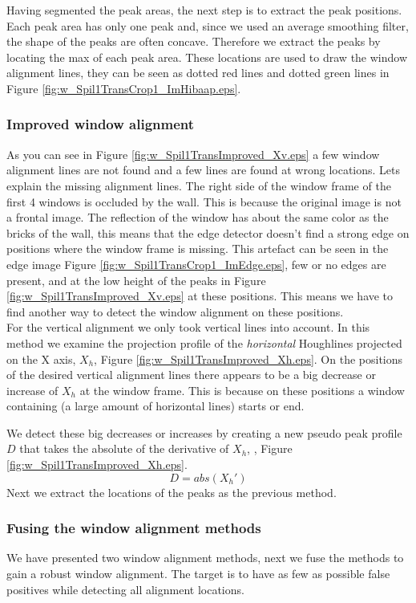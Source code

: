 Having segmented the peak areas, the next step is to extract the peak positions. 
Each peak area has only one peak and, since we used an average smoothing filter, the shape of 
the peaks are often concave. Therefore we extract the peaks by locating the max of each peak area. 
These locations are used to draw the window alignment lines, they can be seen
as dotted red lines and dotted green lines in Figure \ref{fig:w_Spil1TransCrop1_ImHibaap.eps}.


\subsubsection{Improved window alignment}
As you can see in Figure \ref{fig:w_Spil1TransImproved_Xv.eps}
a few window alignment lines are not found and a few lines are found at wrong locations.
Lets explain the missing alignment lines.
The right side of the window frame of the first 4 windows is occluded by the
wall. This is because the original image is not a frontal image.
The reflection of the window has about the same color as the bricks of
the wall, this means that the edge detector
doesn't find a strong edge on positions where the window frame is missing.
This artefact can be seen in the edge image Figure \ref{fig:w_Spil1TransCrop1_ImEdge.eps}, few or no edges are present, and
at the low height of the peaks in Figure \ref{fig:w_Spil1TransImproved_Xv.eps} at these positions.
This means we have to find another way to detect the window alignment on these positions.\\

For the vertical alignment we only took vertical lines into account.
In this method we examine the projection profile of the \emph{horizontal} Houghlines
projected on the X axis, $X_h$, Figure \ref{fig:w_Spil1TransImproved_Xh.eps}.
On the positions of the desired vertical alignment lines there appears to be a 
big decrease or increase of $X_h$ at the window frame. This is because on these
positions a window containing (a large amount of horizontal lines) starts or end.

We detect these big decreases or increases by creating a new pseudo peak profile
$D$ that takes the absolute of the derivative of $X_h$, , Figure \ref{fig:w_Spil1TransImproved_Xh.eps}.
\[D = abs( X_{h}')\]
Next we extract the locations of the peaks as the previous method.

\subsubsection{Fusing the window alignment methods}
We have presented two window alignment methods, next we fuse the methods to
gain a robust window alignment.
The target is to have as few as possible false positives while detecting all alignment locations.\\

